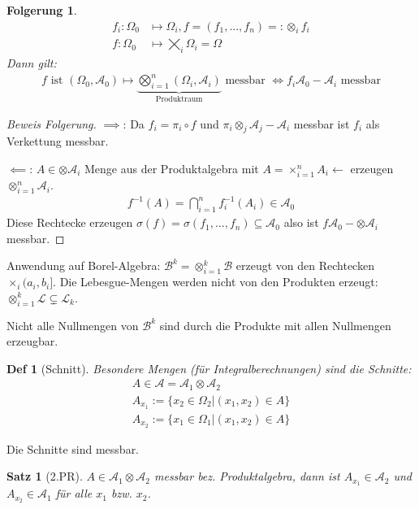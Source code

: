 \documentclass[]{article}
\newtheorem{theorem}{Satz}
\newtheorem*{corollary}{Folgerung}
\newtheorem*{definition*}{Def}
\begin{document}
\begin{corollary}
	\begin{align*}
		f_i:\Omega_0 &\mapsto \Omega_i, f=(f_1,...,f_n) =: \otimes_i f_i\\
		f: \Omega_0 &\mapsto \bigtimes_i\Omega_i = \Omega
	\end{align*}
	Dann gilt:
	\begin{align*}
		f \text{ ist } (\Omega_0,\mathcal{A}_0) \mapsto \underbrace{\bigotimes_{i=1}^{n}(\Omega_i, \mathcal{A}_i)}_{\text{Produktraum}}  \text{ messbar } \iff f_i \mathcal{A}_0-\mathcal{A}_i \text{ messbar}
	\end{align*}
\end{corollary}
\begin{proof}[Beweis Folgerung]
	$\implies$: Da $f_i=\pi_i\circ f$ und $\pi_i \otimes_j \mathcal{A}_j-\mathcal{A}_i$ messbar ist $f_i$ als Verkettung messbar.
	
	$\impliedby$: $A \in \otimes\mathcal{A}_i$ Menge aus der Produktalgebra mit $A = \times_{i=1}^{n}A_i \leftarrow$ erzeugen $\otimes_{i=1}^{n} \mathcal{A}_i$.
	\begin{align*}
		f^{-1}(A) = \bigcap_{i=1}^{n}f_i^{-1}(A_i) \in \mathcal{A}_0
	\end{align*}
	Diese Rechtecke erzeugen $\sigma(f) = \sigma(f_1,...,f_n) \subseteq \mathcal{A}_0$ also ist $f \mathcal{A}_0-\otimes\mathcal{A}_i$ messbar.
\end{proof}

Anwendung auf Borel-Algebra: $\mathcal{B}^k=\otimes_{i=1}^k\mathcal{B}$ erzeugt von den Rechtecken $\times_i (a_i,b_i]$. Die Lebesgue-Mengen werden nicht von den Produkten erzeugt: $\otimes_{i=1}^k\mathcal{L} \subsetneq \mathcal{L}_k$.

Nicht alle Nullmengen von $\mathcal{B}^k$ sind durch die Produkte mit allen Nullmengen erzeugbar.

\begin{definition*}[Schnitt]
	Besondere Mengen (für Integralberechnungen) sind die Schnitte:
	\begin{align*}
		A \in \mathcal{A} = \mathcal{A}_1 \otimes \mathcal{A}_2\\
		A_{x_1} := \{x_2 \in \Omega_2| (x_1,x_2) \in A\}\\
		A_{x_2} := \{x_1 \in \Omega_1| (x_1,x_2) \in A\}
	\end{align*}
\end{definition*}

Die Schnitte sind messbar.
\begin{theorem}[2.PR]
	$A \in \mathcal{A}_1\otimes\mathcal{A}_2$ messbar bez. Produktalgebra, dann ist $A_{x_1}\in\mathcal{A}_2$ und $A_{x_2}\in\mathcal{A}_1$ für alle $x_1$ bzw. $x_2$.
\end{theorem}
\end{document}
